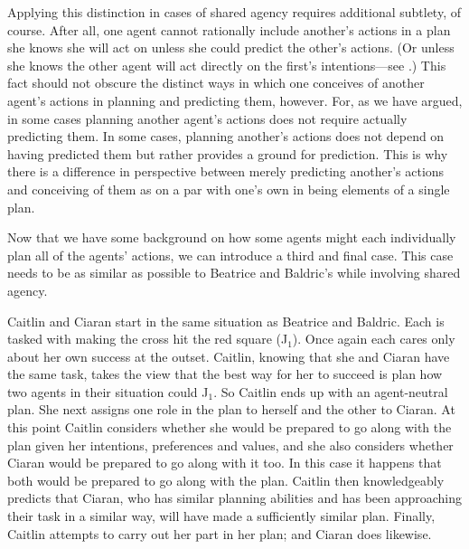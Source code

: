 \documentclass[12pt,\papersize]{extarticle}
\begin{document}
Applying this distinction in cases of shared agency requires additional subtlety, of course.
After all,
one agent cannot rationally include another's actions in a plan she knows she will act on unless she could predict the other's actions.
(Or unless she knows the other agent will act directly on the first's intentions---see \citet{roth_shared_agency}.) 
This fact should not obscure the distinct ways in which one conceives of another agent's actions in planning and predicting them, however.
For, as we have argued, in some cases planning another agent's actions does not require actually predicting them.
In some cases, planning another's actions does not depend on having predicted them but rather provides a ground for prediction.
This is why there is a difference in perspective between merely predicting another's actions and conceiving of them as on a par with one's own in being elements of a single plan.
 
Now that we have some background on how some agents might each individually plan all of the agents' actions,
we can introduce a third and final case.
This case needs to be as similar as possible to Beatrice and Baldric's while involving shared agency.

Caitlin and Ciaran start in the same situation as Beatrice and Baldric. 
Each is tasked with making the cross hit the red square (J$_1$). 
Once again each cares only about her own success at the outset. 
Caitlin, knowing that she and Ciaran have the same task, takes the view that the best way for her to succeed is plan how two agents in their situation could J$_1$.  
So Caitlin ends up with an agent-neutral plan.
She next assigns one role in the plan to herself and the other to Ciaran.
At this point Caitlin considers whether she would be prepared to go along with the plan given her intentions, preferences and values, and she also considers whether Ciaran would be prepared to go along with it too. 
In this case it happens that both would be prepared to go along with the plan.
Caitlin then knowledgeably predicts that Ciaran, who has similar planning abilities and has been approaching their task in a similar way, will have made a sufficiently similar plan.
Finally, Caitlin attempts to carry out her part in her plan; and Ciaran does likewise.
\end{document}
